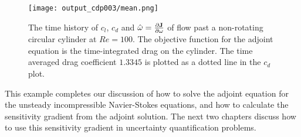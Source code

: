 \begin{figure}[htb!] \center
\texttt{[image: output\_cdp003/mean.png]}
\caption{The time history of $c_l$, $c_d$ and
$\hat{\omega}= \frac{\partial \bf J}{\partial \omega}$ of flow past a
non-rotating circular cylinder at $Re=100$.  The objective function for the
adjoint equation is the time-integrated drag on the cylinder.
The time averaged drag coefficient $1.3345$ is plotted as a dotted line in
the $c_d$ plot.}
 \label{mean}
\end{figure}

This example completes our discussion of how to solve the adjoint equation for
the unsteady incompressible Navier-Stokes equations, and how to calculate the
sensitivity gradient from the adjoint solution.  The next two chapters
discuss how to use this sensitivity gradient in uncertainty quantification
problems.

